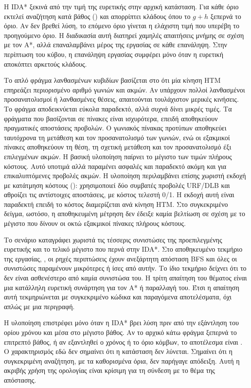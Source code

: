 Η IDA* ξεκινά από την τιμή της ευρετικής στην αρχική κατάσταση. Για κάθε όριο εκτελεί αναζήτηση κατά βάθος () και απορρίπτει κλάδους όπου το \(g+h\) ξεπερνά το όριο. Αν δεν βρεθεί λύση, το επόμενο όριο γίνεται η ελάχιστη τιμή που υπερέβη το προηγούμενο όριο. Η διαδικασία αυτή διατηρεί χαμηλές απαιτήσεις μνήμης σε σχέση με τον A*, αλλά επαναλαμβάνει μέρος της εργασίας σε κάθε επανάληψη. Στην περίπτωση του κύβου, η επανάληψη εργασίας συμφέρει μόνο όταν η ευρετική αποκόπτει αρκετούς κλάδους.

Το απλό φράγμα λανθασμένων κυβιδίων βασίζεται στο ότι μία κίνηση HTM επηρεάζει περιορισμένο αριθμό γωνιών και ακμών. Αν υπάρχουν πολλοί λανθασμένοι προσανατολισμοί ή λανθασμένες θέσεις, απαιτούνται τουλάχιστον μερικές κινήσεις. Το φράγμα αποδεικνύεται εύκολα παραδεκτό, αλλά συχνά δίνει μικρές τιμές. Τα φράγματα που βασίζονται σε πίνακες είναι ισχυρότερα, επειδή αποθηκεύουν πραγματικές αποστάσεις προβολών. Ο γωνιακός πίνακας προτύπων αποθηκεύει ταυτόχρονα τη μετάθεση και τον προσανατολισμό των γωνιών, ενώ οι εξακμικοί πίνακες αποθηκεύουν τη θέση, τη σχετική μετάθεση και τον προσανατολισμό έξι επιλεγμένων ακμών. Η βασική υλοποίηση παίρνει το μέγιστο των τιμών πλήρους κόστους. Αυτό υποτιμά αλλά παραμένει ασφαλές και παραδεκτό ακόμη και για επικαλυπτόμενες προβολές ακμών. Η υλοποίηση περιλαμβάνει επίσης χωριστή εκδοχή με κατάτμηση κόστους (): χρησιμοποιεί δύο συμβατές προβολές URF/DLB και αθροίζει τις αντίστοιχες αποστάσεις, με κόστος τελεστή 0/1. Η εκδοχή αυτή είναι παραδεκτή επειδή το κόστος διαμερίζεται ανά κίνηση HTM. Στο συγκεκριμένο δείγμα, ωστόσο, η αποθηκευμένη μέτρηση δεν έδειξε καμία βελτίωση σε σχέση με το μέγιστο που δίνουν οι οκτώ εξακμικοί πίνακες πλήρους κόστους.

Το σενάριο  καταγράφει χωριστά τις τέσσερις συνιστώσες της προεπιλεγμένης ευρετικής και το τελικό μέγιστο που περνά στην IDA*. Στο αποθηκευμένο τεκμήριο της εργασίας, , οι ρηχές περιπτώσεις έχουν ανεξάρτητη απόσταση BFS και όλες οι συνιστώσες παραμένουν μικρότερες ή ίσες από αυτήν. Το ίδιο τεκμήριο δείχνει ότι το  δεν είναι ασθενέστερο από καμία συνιστώσα του. Η τρίτη απαίτηση του θέματος είναι μια κατάλληλη ευρετική συνάρτηση για τον A* ή παραλλαγή του. Έτσι η απαίτηση αυτή τεκμηριώνεται με συγκεκριμένο κώδικα και παραγόμενα αποτελέσματα, όχι απλώς με μια περιγραφή.

Η υλοποίηση επιστρέφει  μόνο όταν η IDA* βρει λύση πριν από την εξάντληση του ορίου χρόνου και μέσα στο μέγιστο βάθος. Αν το αρχικό κάτω φράγμα ξεπερνά το επιτρεπτό βάθος, ή αν εξαντληθεί ο χρόνος ή το όριο κόμβων, το αποτέλεσμα είναι . Ο χαρακτηρισμός  εδώ δεν σημαίνει ότι η κατάσταση δεν λύνεται. Σημαίνει ότι η συγκεκριμένη αναζήτηση, με τα καθορισμένα όρια, δεν παρήγαγε απόδειξη. Αυτή η ακριβής χρήση της ορολογίας είναι κρίσιμη για τη σύνδεση με το θέμα της απόστασης.

